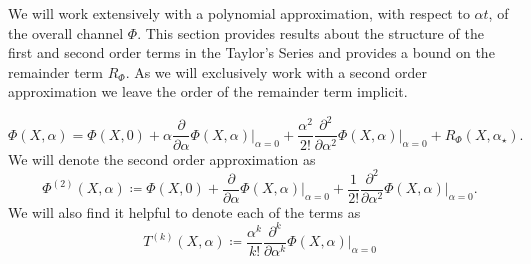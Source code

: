 \documentclass{article}
\begin{document}
We will work extensively with a polynomial approximation, with respect to $\alpha t$, of the overall channel $\Phi$. This section provides results about the structure of the first and second order terms in the Taylor's Series and provides a bound on the remainder term $R_{\Phi}$. As we will exclusively work with a second order approximation we leave the order of the remainder term implicit.

\begin{equation}
    \Phi(X, \alpha) = \Phi(X, 0) + \alpha \frac{\partial}{\partial \alpha} \Phi(X, \alpha) \bigg|_{\alpha = 0} + \frac{\alpha^2}{2!} \frac{\partial^2}{\partial \alpha^2} \Phi(X, \alpha) \bigg|_{\alpha = 0} + R_{\Phi}(X, \alpha_{\star}).
\end{equation}
We will denote the second order approximation as
\begin{equation}
    \Phi^{(2)}(X, \alpha) \coloneqq \Phi(X, 0) + \frac{\partial}{\partial \alpha} \Phi(X, \alpha) \bigg|_{\alpha = 0} + \frac{1}{2!} \frac{\partial^2}{\partial \alpha^2} \Phi(X, \alpha) \bigg|_{\alpha = 0}. \label{def:second_order_approx}
\end{equation}
We will also find it helpful to denote each of the terms as
\begin{equation}
    T^{(k)}(X, \alpha) \coloneqq \frac{\alpha^k}{k!} \frac{\partial^k}{\partial \alpha^k} \Phi(X, \alpha)\bigg|_{\alpha = 0} \label{def:taylor_series_terms}
\end{equation}
\end{document}
